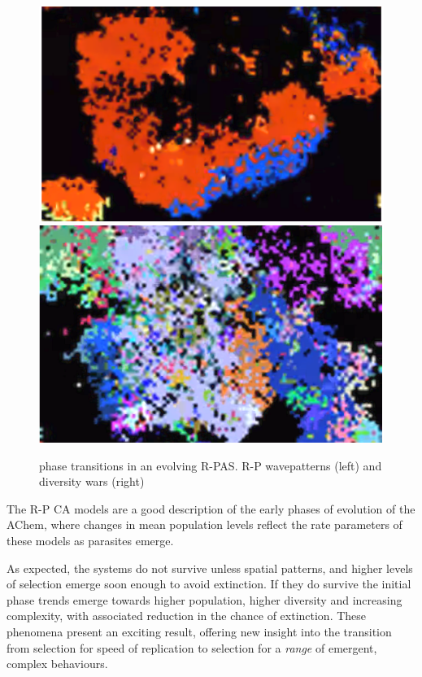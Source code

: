 \documentclass[twocolumn]{article}
\begin{document}
\begin{figure}[H]
\centering
\includegraphics[clip,trim={0cm 0cm 0cm 0cm},width=0.45\linewidth]{wave.png}
\includegraphics[clip,trim={0cm 0cm 0cm 0cm},width=0.45\linewidth]{complex.png}
\caption{\label{figyt}
phase transitions in an evolving R-PAS. R-P wavepatterns (left) and diversity wars (right)
}
\end{figure}


The R-P CA models are a good description of the early phases of
evolution of the AChem, where changes in mean population levels reflect
the rate parameters of these models as parasites emerge.

As expected, the systems do not survive unless spatial patterns, and higher levels of selection emerge soon enough to avoid extinction.
If they do survive the initial phase trends emerge towards higher population, higher diversity and increasing complexity, with associated reduction in the chance of extinction. 
These phenomena present an exciting result, offering new insight into the transition from selection for speed of replication to selection for a {\it range} of emergent, complex behaviours.





\end{document}
